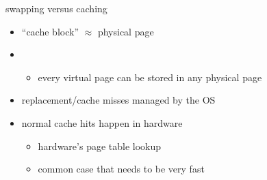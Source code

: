 


\begin{frame}{swapping versus caching}
\begin{itemize}
    \item ``cache block'' $\approx$ physical page
    \item {}
        \begin{itemize}
        \item every virtual page can be stored in any physical page
        \end{itemize}
    \item replacement/cache misses managed by the OS
    \item normal cache hits happen in hardware
        \begin{itemize}
        \item hardware's page table lookup
        \item common case that needs to be very fast
        \end{itemize}
\end{itemize}
\end{frame}
